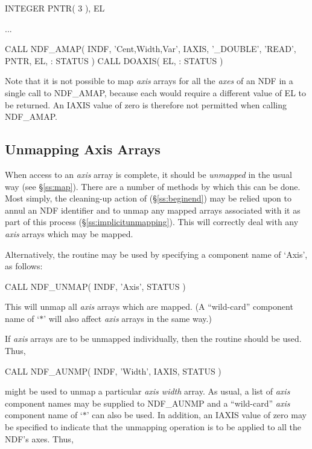 \documentclass[twoside,11pt,nolof]{starlink}
\providecommand{\st}[1]{{\emph{#1}}}
\begin{document}
\small
\begin{terminalv}
      INTEGER PNTR( 3 ), EL

      ...

      CALL NDF_AMAP( INDF, 'Cent,Width,Var', IAXIS, '_DOUBLE', 'READ', PNTR, EL,
     :               STATUS )
      CALL DOAXIS( EL, %
     :             STATUS )
\end{terminalv}
\normalsize

Note that it is not possible to map \st{axis\/} arrays for all the
\st{axes\/} of an NDF in a single call to NDF\_AMAP, because each
would require
a different value of EL to be returned.
An IAXIS value of zero is therefore not permitted when calling NDF\_AMAP.

\subsection{Unmapping Axis Arrays}

When access to an \st{axis\/} array is complete, it should be
\st{unmapped\/} in the usual way (see \S\ref{ss:map}). There are a
number
of methods by which this can be done.
Most simply, the cleaning-up action of  (\S\ref{ss:beginend}) may be
relied upon to annul an NDF identifier and to unmap any mapped arrays
associated with it as part of this process (\S\ref{ss:implicitunmapping}).
This will correctly deal with any \st{axis\/} arrays which may be mapped.

Alternatively, the routine  may be used by specifying a component
name of `Axis', as follows:

\small
\begin{terminalv}
      CALL NDF_UNMAP( INDF, 'Axis', STATUS )
\end{terminalv}
\normalsize

This will unmap all \st{axis\/} arrays which are mapped.
(A ``wild-card'' component name of `$*$' will also affect \st{axis\/}
arrays in the same way.)

If \st{axis\/} arrays are to be unmapped individually, then the routine
 should be used.
Thus,

\small
\begin{terminalv}
      CALL NDF_AUNMP( INDF, 'Width', IAXIS, STATUS )
\end{terminalv}
\normalsize

might be used to unmap a particular \st{axis width\/} array.
As usual, a list of \st{axis\/} component names may be supplied to
NDF\_AUNMP and a ``wild-card'' \st{axis\/} component name of `$*$' can also be
used.
In addition, an IAXIS value of zero may be specified to indicate that the
unmapping operation is to be applied to all the NDF's axes.
Thus,
\end{document}
